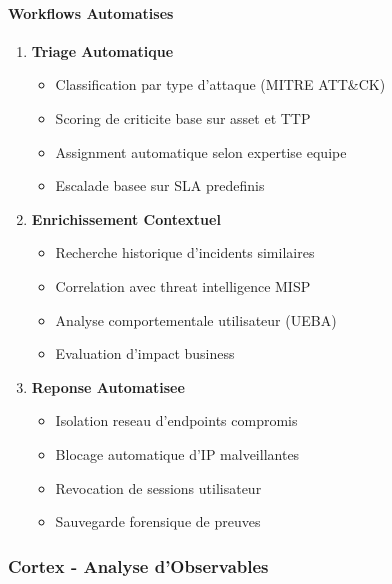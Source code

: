 \paragraph{Workflows Automatises}
\begin{enumerate}
    \item \textbf{Triage Automatique}
          \begin{itemize}
              \item Classification par type d'attaque (MITRE ATT\&CK)
              \item Scoring de criticite base sur asset et TTP
              \item Assignment automatique selon expertise equipe
              \item Escalade basee sur SLA predefinis
          \end{itemize}

    \item \textbf{Enrichissement Contextuel}
          \begin{itemize}
              \item Recherche historique d'incidents similaires
              \item Correlation avec threat intelligence MISP
              \item Analyse comportementale utilisateur (UEBA)
              \item Evaluation d'impact business
          \end{itemize}

    \item \textbf{Reponse Automatisee}
          \begin{itemize}
              \item Isolation reseau d'endpoints compromis
              \item Blocage automatique d'IP malveillantes
              \item Revocation de sessions utilisateur
              \item Sauvegarde forensique de preuves
          \end{itemize}
\end{enumerate}

\subsubsection{Cortex - Analyse d'Observables}

